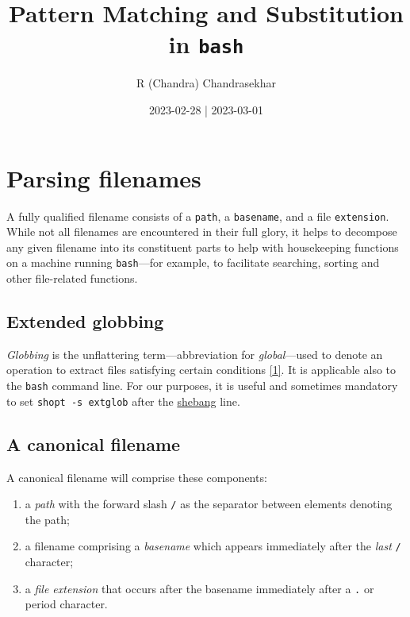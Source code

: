 \documentclass[
  a4paper,
]{article}
\title{Pattern Matching and Substitution in \texttt{bash}}
\author{R (Chandra) Chandrasekhar}
\date{2023-02-28 | 2023-03-01}
\providecommand{\tightlist}{%
  \setlength{\itemsep}{0pt}\setlength{\parskip}{0pt}}
\begin{document}
\maketitle

\thispagestyle{empty}


\hypertarget{parsing-filenames}{%
\section{Parsing filenames}\label{parsing-filenames}}

A fully qualified filename consists of a \texttt{path}, a
\texttt{basename}, and a file \texttt{extension}. While not all
filenames are encountered in their full glory, it helps to decompose any
given filename into its constituent parts to help with housekeeping
functions on a machine running \texttt{bash}---for example, to
facilitate searching, sorting and other file-related functions.

\hypertarget{extended-globbing}{%
\subsection{Extended globbing}\label{extended-globbing}}

\emph{Globbing} is the unflattering term---abbreviation for
\emph{global}---used to denote an operation to extract files satisfying
certain conditions \protect\hyperlink{ref-glob2023}{{[}1{]}}. It is
applicable also to the \texttt{bash} command line. For our purposes, it
is useful and sometimes mandatory to set \texttt{shopt\ -s\ extglob}
after the \href{https://en.wikipedia.org/wiki/Shebang_(Unix)}{shebang}
line.

\hypertarget{a-canonical-filename}{%
\subsection{A canonical filename}\label{a-canonical-filename}}

A canonical filename will comprise these components:

\begin{enumerate}
\def\labelenumi{\alph{enumi}.}
\tightlist
\item
  a \emph{path} with the forward slash \texttt{/} as the separator
  between elements denoting the path;
\item
  a filename comprising a \emph{basename} which appears immediately
  after the \emph{last} \texttt{/} character;
\item
  a \emph{file extension} that occurs after the basename immediately
  after a \texttt{.} or period character.
\end{enumerate}
\end{document}
